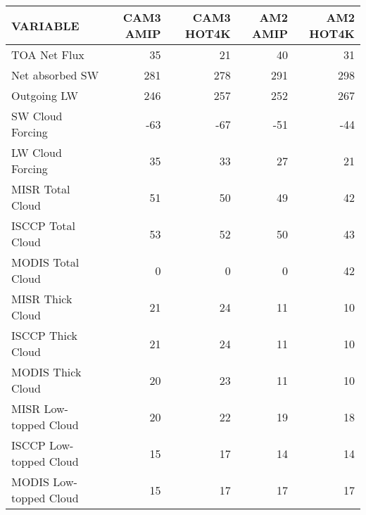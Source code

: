 \begin{tabular}{lrrrr}
\hline
                VARIABLE &                CAM3 AMIP &               CAM3 HOT4K &                 AM2 AMIP &                AM2 HOT4K \\ \hline
            TOA Net Flux &                       35 &                       21 &                       40 &                       31 \\
         Net absorbed SW &                      281 &                      278 &                      291 &                      298 \\
             Outgoing LW &                      246 &                      257 &                      252 &                      267 \\
        SW Cloud Forcing &                      -63 &                      -67 &                      -51 &                      -44 \\
        LW Cloud Forcing &                       35 &                       33 &                       27 &                       21 \\
        MISR Total Cloud &                       51 &                       50 &                       49 &                       42 \\
       ISCCP Total Cloud &                       53 &                       52 &                       50 &                       43 \\
       MODIS Total Cloud &                        0 &                        0 &                        0 &                       42 \\
        MISR Thick Cloud &                       21 &                       24 &                       11 &                       10 \\
       ISCCP Thick Cloud &                       21 &                       24 &                       11 &                       10 \\
       MODIS Thick Cloud &                       20 &                       23 &                       11 &                       10 \\
   MISR Low-topped Cloud &                       20 &                       22 &                       19 &                       18 \\
  ISCCP Low-topped Cloud &                       15 &                       17 &                       14 &                       14 \\
  MODIS Low-topped Cloud &                       15 &                       17 &                       17 &                       17 \\

\end{tabular}
